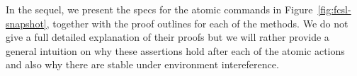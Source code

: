 In the sequel, we present the specs for the atomic commands in
Figure~\ref{fig:fcsl-snapshot}, together with the proof outlines for
each of the methods. We do not give a full detailed explanation of
their proofs but we will rather provide a general intuition on why
these assertions hold after each of the atomic actions and also why
there are stable under environment intereference.







